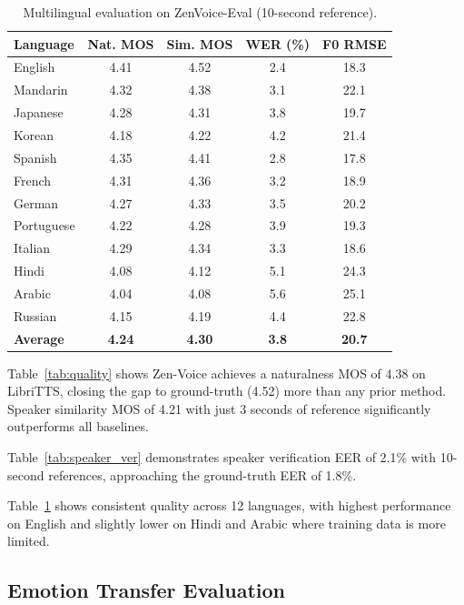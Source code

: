 \documentclass[11pt,a4paper]{article}
\begin{document}
\begin{table}[t]
\centering
\caption{Multilingual evaluation on ZenVoice-Eval (10-second reference).}
\label{tab:multilingual}
\begin{tabular}{lcccc}
\toprule
\textbf{Language} & \textbf{Nat. MOS} & \textbf{Sim. MOS} & \textbf{WER (\%)} & \textbf{F0 RMSE} \\
\midrule
English & 4.41 & 4.52 & 2.4 & 18.3 \\
Mandarin & 4.32 & 4.38 & 3.1 & 22.1 \\
Japanese & 4.28 & 4.31 & 3.8 & 19.7 \\
Korean & 4.18 & 4.22 & 4.2 & 21.4 \\
Spanish & 4.35 & 4.41 & 2.8 & 17.8 \\
French & 4.31 & 4.36 & 3.2 & 18.9 \\
German & 4.27 & 4.33 & 3.5 & 20.2 \\
Portuguese & 4.22 & 4.28 & 3.9 & 19.3 \\
Italian & 4.29 & 4.34 & 3.3 & 18.6 \\
Hindi & 4.08 & 4.12 & 5.1 & 24.3 \\
Arabic & 4.04 & 4.08 & 5.6 & 25.1 \\
Russian & 4.15 & 4.19 & 4.4 & 22.8 \\
\midrule
\textbf{Average} & \textbf{4.24} & \textbf{4.30} & \textbf{3.8} & \textbf{20.7} \\
\bottomrule
\end{tabular}
\end{table}

Table~\ref{tab:quality} shows Zen-Voice achieves a naturalness MOS of 4.38 on LibriTTS, closing the gap to ground-truth (4.52) more than any prior method. Speaker similarity MOS of 4.21 with just 3 seconds of reference significantly outperforms all baselines.

Table~\ref{tab:speaker_ver} demonstrates speaker verification EER of 2.1\% with 10-second references, approaching the ground-truth EER of 1.8\%.

Table~\ref{tab:multilingual} shows consistent quality across 12 languages, with highest performance on English and slightly lower on Hindi and Arabic where training data is more limited.

\subsection{Emotion Transfer Evaluation}
\end{document}
